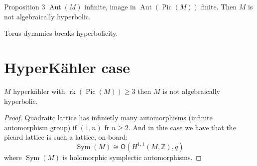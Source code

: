 \begin{thing3}{Proposition 3}\leavevmode
	$\operatorname{Aut}(M)$ infinite, image in $\operatorname{Aut}(\operatorname{Pic}(M))$ finite. Then $M$ is not algebraically hyperbolic.
\end{thing3}

\begin{upshot}\leavevmode
	Torus dynamics breaks hyperbolicity.
\end{upshot}

\section{HyperKähler case}

\begin{thm}[Them?]\leavevmode
$M$ hyperkähler with $\operatorname{rk}(\operatorname{Pic}(M))\geq 3$ then $M$ is not algebraically hyperbolic.
\end{thm}

\begin{proof}\leavevmode
Quadraitc lattice has infinietly many automorphisms (infinite automorphism group) if $(1,n)$ fr  $n\geq  2$. And in thie case we have that the picard  lattice is such a lattice; on board:
\[\operatorname{Sym}(M)\cong\mathsf{O}(H^{1,1}(M,\mathbb{Z}),q)\]
where $\operatorname{Sym}(M)$ is holomorphic symplectic automorphisms.

\end{proof}



































